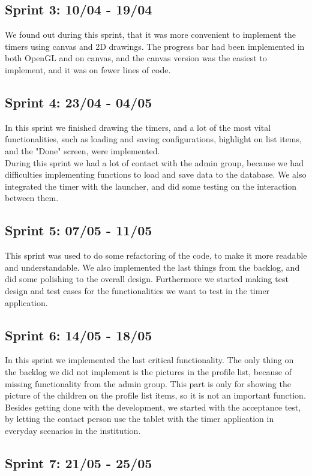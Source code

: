 \subsection*{Sprint 3: 10/04 - 19/04}
We found out during this sprint, that it was more convenient to implement the timers using canvas and 2D drawings. The progress bar had been implemented in both OpenGL and on canvas, and the canvas version was the easiest to implement, and it was on fewer lines of code.	

\subsection*{Sprint 4: 23/04 - 04/05}
In this sprint we finished drawing the timers, and a lot of the most vital functionalities, such as loading and saving configurations, highlight on list items, and the "Done" screen, were implemented.\\
	During this sprint we had a lot of contact with the admin group, because we had difficulties implementing functions to load and save data to the database. We also integrated the timer with the launcher, and did some testing on the interaction between them.

\subsection*{Sprint 5: 07/05 - 11/05} 
This sprint was used to do some refactoring of the code, to make it more readable and understandable. We also implemented the last things from the backlog, and did some polishing to the overall design. Furthermore we started making test design and test cases for the functionalities we want to test in the timer application.

\subsection*{Sprint 6: 14/05 - 18/05}
In this sprint we implemented the last critical functionality. The only thing on the backlog we did not implement is the pictures in the profile list, because of missing functionality from the admin group. This part is only for showing the picture of the children on the profile list items, so it is not an important function.\\
   Besides getting done with the development, we started with the acceptance test, by letting the contact person use the tablet with the timer application in everyday scenarios in the institution.
	
\subsection*{Sprint 7: 21/05 - 25/05}
